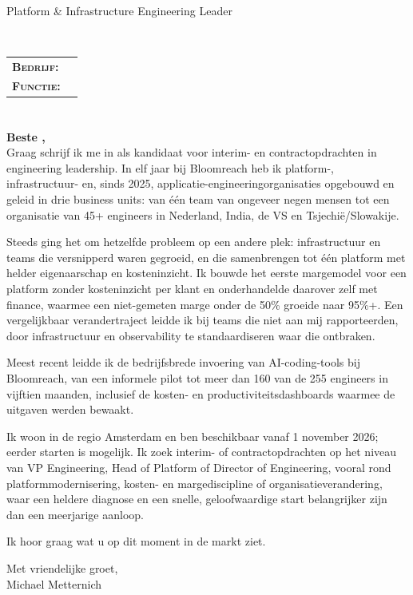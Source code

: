 \documentclass{muratcan_cv}
\makeatletter
\renewcommand\headerview{%
\begin{center}
    \name \\[0.05cm]
    {\small Platform \& Infrastructure Engineering Leader} \\[0.05cm]
    \contact
\end{center}
}
\renewcommand\coverlettersubview{%
\begin{tabular}{>{\scshape \bfseries \color{\@themecolor}}l  >{\small }l}
Bedrijf: & \@companyname \\
Functie: & \@claimedposition \\
\end{tabular}
}
\renewcommand\coverletter[1]{%
\\  \coverlettersubview
\section{} \vspace{1ex}
\textbf{Beste \@contactperson, \\[0.1cm]}
  #1
}
\makeatother
\begin{document}
\headerview
\vspace{1ex}
\coverletter{ %
Graag schrijf ik me in als kandidaat voor interim- en contractopdrachten in engineering leadership. In elf jaar bij Bloomreach heb ik platform-, infrastructuur- en, sinds 2025, applicatie-engineeringorganisaties opgebouwd en geleid in drie business units: van één team van ongeveer negen mensen tot een organisatie van 45+ engineers in Nederland, India, de VS en Tsjechië/Slowakije.

Steeds ging het om hetzelfde probleem op een andere plek: infrastructuur en teams die versnipperd waren gegroeid, en die samenbrengen tot één platform met helder eigenaarschap en kosteninzicht. Ik bouwde het eerste margemodel voor een platform zonder kosteninzicht per klant en onderhandelde daarover zelf met finance, waarmee een niet-gemeten marge onder de 50\% groeide naar 95\%+. Een vergelijkbaar verandertraject leidde ik bij teams die niet aan mij rapporteerden, door infrastructuur en observability te standaardiseren waar die ontbraken.

Meest recent leidde ik de bedrijfsbrede invoering van AI-coding-tools bij Bloomreach, van een informele pilot tot meer dan 160 van de 255 engineers in vijftien maanden, inclusief de kosten- en productiviteitsdashboards waarmee de uitgaven werden bewaakt.

Ik woon in de regio Amsterdam en ben beschikbaar vanaf 1 november 2026; eerder starten is mogelijk. Ik zoek interim- of contractopdrachten op het niveau van VP Engineering, Head of Platform of Director of Engineering, vooral rond platformmodernisering, kosten- en margediscipline of organisatieverandering, waar een heldere diagnose en een snelle, geloofwaardige start belangrijker zijn dan een meerjarige aanloop.

Ik hoor graag wat u op dit moment in de markt ziet.

\vspace{1ex}
Met vriendelijke groet, \\
Michael Metternich
}
\end{document}
